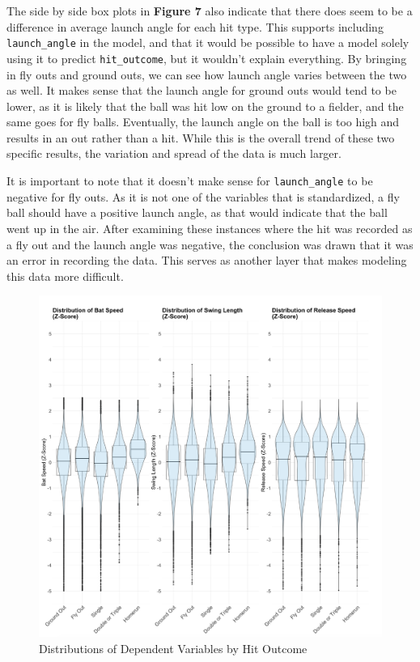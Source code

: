 \documentclass[
  letterpaper,
  DIV=11,
  numbers=noendperiod]{scrartcl}
\begin{document}
The side by side box plots in \textbf{Figure 7} also indicate that there
does seem to be a difference in average launch angle for each hit type.
This supports including \texttt{launch\_angle} in the model, and that it
would be possible to have a model solely using it to predict
\texttt{hit\_outcome}, but it wouldn't explain everything. By bringing
in fly outs and ground outs, we can see how launch angle varies between
the two as well. It makes sense that the launch angle for ground outs
would tend to be lower, as it is likely that the ball was hit low on the
ground to a fielder, and the same goes for fly balls. Eventually, the
launch angle on the ball is too high and results in an out rather than a
hit. While this is the overall trend of these two specific results, the
variation and spread of the data is much larger.

It is important to note that it doesn't make sense for
\texttt{launch\_angle} to be negative for fly outs. As it is not one of
the variables that is standardized, a fly ball should have a positive
launch angle, as that would indicate that the ball went up in the air.
After examining these instances where the hit was recorded as a fly out
and the launch angle was negative, the conclusion was drawn that it was
an error in recording the data. This serves as another layer that makes
modeling this data more difficult.

\begin{figure}[H]

{\centering \includegraphics{./images/figures/fig8.png}

}

\caption{Distributions of Dependent Variables by Hit Outcome}

\end{figure}%
\end{document}

